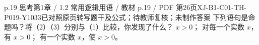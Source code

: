 \par\noindent\begin{minipage}{\linewidth}
\begin{bankitem}{p.19 思考}{第1章 / 1.2 常用逻辑用语 / 教材 p.19 / PDF 第26页}{XJ-B1-C01-TH-P019-Y1033}{已对照原页转写题干及公式；待教师复核；未制作答案}
下列语句是命题吗？将（2）（3）分别与（1）比较，你发现了什么？
$x>0$；
对每一个实数 $x$，有 $x>0$；
有一个实数 $x$，使 $x>0$。
\end{bankitem}
\end{minipage}\par\medskip
